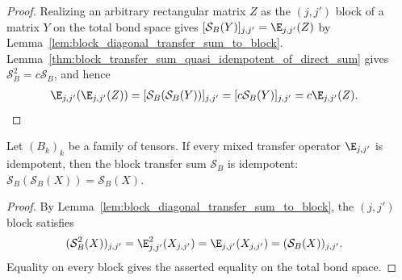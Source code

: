 \begin{proof}\leanok
    Realizing an arbitrary rectangular matrix $Z$ as the $(j,j')$ block of a
    matrix $Y$ on the total bond space gives
    $[\mathcal S_B(Y)]_{j,j'}=\E_{j,j'}(Z)$ by
    Lemma~\ref{lem:block_diagonal_transfer_sum_to_block}.
    Lemma~\ref{thm:block_transfer_sum_quasi_idempotent_of_direct_sum} gives
    $\mathcal S_B^2=c\mathcal S_B$, and hence
    \begin{align}
        \E_{j,j'}(\E_{j,j'}(Z))
         & =[\mathcal S_B(\mathcal S_B(Y))]_{j,j'}
        =[c\mathcal S_B(Y)]_{j,j'}
        =c\E_{j,j'}(Z).
        \notag
    \end{align}
\end{proof}

\begin{lemma}%
    \label{lem:block_transfer_sum_idempotent_of_pairwise_mixed}
    \leanok
    Let $(B_k)_k$ be a family of tensors. If every mixed transfer operator
    $\E_{j,j'}$ is idempotent, then the block transfer sum $\mathcal S_B$ is
    idempotent: $\mathcal S_B(\mathcal S_B(X))=\mathcal S_B(X)$.
\end{lemma}
\begin{proof}\leanok
    By Lemma~\ref{lem:block_diagonal_transfer_sum_to_block}, the $(j,j')$
    block satisfies
    \begin{align}
        (\mathcal S_B^2(X))_{j,j'}
         & = \E_{j,j'}^2(X_{j,j'})
        = \E_{j,j'}(X_{j,j'})
        = (\mathcal S_B(X))_{j,j'}.
        \notag
    \end{align}
    Equality on every block gives the asserted equality on the total bond
    space.
\end{proof}


